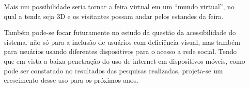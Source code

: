 Mais um possibilidade seria tornar a feira virtual em um “mundo virtual”, no qual a tenda seja 3D e os visitantes possam andar pelos estandes da feira.

Também pode-se focar futuramente no estudo da questão da acessibilidade do sistema, não só para a inclusão de usuários com deficiência visual, mas também para usuários usando diferentes dispositivos para o acesso a rede social. Tendo que em vista a baixa penetração do uso de internet em dispositivos móveis, como pode ser constatado no resultados das pesquisas realizadas, projeta-se um crescimento desse uso para os próximos anos.


